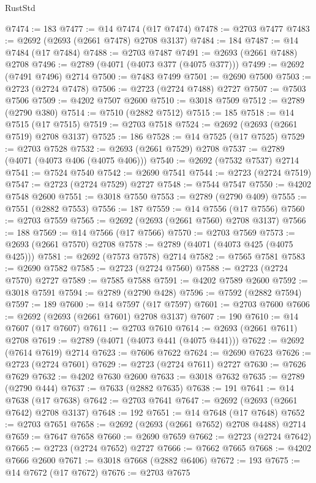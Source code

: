\begin{lexlean}{RustStd}
\begin{coremodule}
@7474 := 183
@7477 := @14 @7474 (@17 @7474)
@7478 := @2703 @7477
@7483 := @2692 (@2693 (@2661 @7478) @2708 @3137)
@7484 := 184
@7487 := @14 @7484 (@17 @7484)
@7488 := @2703 @7487
@7491 := @2693 (@2661 @7488) @2708
@7496 := @2789 (@4071 (@4073 @377 (@4075 @377)))
@7499 := @2692 (@7491 @7496) @2714
@7500 := @7483 @7499
@7501 := @2690 @7500
@7503 := @2723 (@2724 @7478)
@7506 := @2723 (@2724 @7488) @2727
@7507 := @7503 @7506
@7509 := @4202 @7507 @2600
@7510 := @3018 @7509
@7512 := @2789 (@2790 @380)
@7514 := @7510 (@2882 @7512)
@7515 := 185
@7518 := @14 @7515 (@17 @7515)
@7519 := @2703 @7518
@7524 := @2692 (@2693 (@2661 @7519) @2708 @3137)
@7525 := 186
@7528 := @14 @7525 (@17 @7525)
@7529 := @2703 @7528
@7532 := @2693 (@2661 @7529) @2708
@7537 := @2789 (@4071 (@4073 @406 (@4075 @406)))
@7540 := @2692 (@7532 @7537) @2714
@7541 := @7524 @7540
@7542 := @2690 @7541
@7544 := @2723 (@2724 @7519)
@7547 := @2723 (@2724 @7529) @2727
@7548 := @7544 @7547
@7550 := @4202 @7548 @2600
@7551 := @3018 @7550
@7553 := @2789 (@2790 @409)
@7555 := @7551 (@2882 @7553)
@7556 := 187
@7559 := @14 @7556 (@17 @7556)
@7560 := @2703 @7559
@7565 := @2692 (@2693 (@2661 @7560) @2708 @3137)
@7566 := 188
@7569 := @14 @7566 (@17 @7566)
@7570 := @2703 @7569
@7573 := @2693 (@2661 @7570) @2708
@7578 := @2789 (@4071 (@4073 @425 (@4075 @425)))
@7581 := @2692 (@7573 @7578) @2714
@7582 := @7565 @7581
@7583 := @2690 @7582
@7585 := @2723 (@2724 @7560)
@7588 := @2723 (@2724 @7570) @2727
@7589 := @7585 @7588
@7591 := @4202 @7589 @2600
@7592 := @3018 @7591
@7594 := @2789 (@2790 @428)
@7596 := @7592 (@2882 @7594)
@7597 := 189
@7600 := @14 @7597 (@17 @7597)
@7601 := @2703 @7600
@7606 := @2692 (@2693 (@2661 @7601) @2708 @3137)
@7607 := 190
@7610 := @14 @7607 (@17 @7607)
@7611 := @2703 @7610
@7614 := @2693 (@2661 @7611) @2708
@7619 := @2789 (@4071 (@4073 @441 (@4075 @441)))
@7622 := @2692 (@7614 @7619) @2714
@7623 := @7606 @7622
@7624 := @2690 @7623
@7626 := @2723 (@2724 @7601)
@7629 := @2723 (@2724 @7611) @2727
@7630 := @7626 @7629
@7632 := @4202 @7630 @2600
@7633 := @3018 @7632
@7635 := @2789 (@2790 @444)
@7637 := @7633 (@2882 @7635)
@7638 := 191
@7641 := @14 @7638 (@17 @7638)
@7642 := @2703 @7641
@7647 := @2692 (@2693 (@2661 @7642) @2708 @3137)
@7648 := 192
@7651 := @14 @7648 (@17 @7648)
@7652 := @2703 @7651
@7658 := @2692 (@2693 (@2661 @7652) @2708 @4488) @2714
@7659 := @7647 @7658
@7660 := @2690 @7659
@7662 := @2723 (@2724 @7642)
@7665 := @2723 (@2724 @7652) @2727
@7666 := @7662 @7665
@7668 := @4202 @7666 @2600
@7671 := @3018 @7668 (@2882 @6406)
@7672 := 193
@7675 := @14 @7672 (@17 @7672)
@7676 := @2703 @7675

\end{coremodule}
\end{lexlean}
